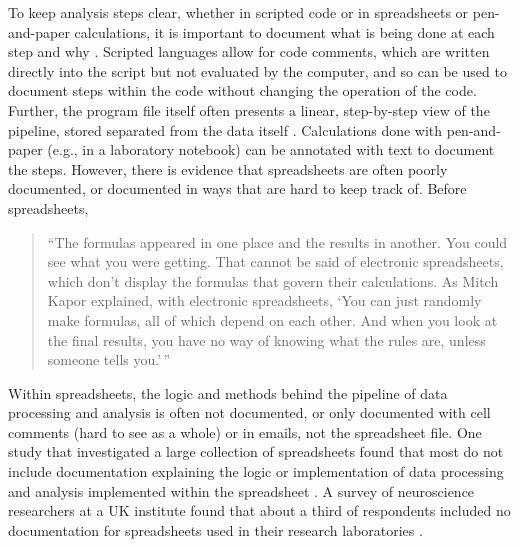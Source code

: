 \documentclass[]{tufte-book}
\begin{document}
To keep analysis steps clear, whether in scripted code or in spreadsheets or
pen-and-paper calculations, it is important to document what is being done at
each step and why \citep{goodman2014ten}. Scripted languages allow for code comments,
which are written directly into the script but not evaluated by the computer,
and so can be used to document steps within the code without changing the
operation of the code. Further, the program file itself often presents a linear,
step-by-step view of the pipeline, stored separated from the data itself
\citep{creeth1985microcomputer}. Calculations done with pen-and-paper (e.g., in a
laboratory notebook) can be annotated with text to document the steps. However,
there is evidence that spreadsheets are often poorly documented, or documented
in ways that are hard to keep track of. Before spreadsheets,

\begin{quote}
``The formulas appeared in one place and the results in another. You could see
what you were getting. That cannot be said of electronic spreadsheets, which
don't display the formulas that govern their calculations. As Mitch Kapor
explained, with electronic spreadsheets, `You can just randomly make formulas,
all of which depend on each other. And when you look at the final results, you
have no way of knowing what the rules are, unless someone tells you.'\,''
\citep{levy1984spreadsheet}
\end{quote}

Within spreadsheets, the logic and methods behind the pipeline of data
processing and analysis is often not documented, or only documented with cell
comments (hard to see as a whole) or in emails, not the spreadsheet file.
One study that investigated a large collection of spreadsheets found that most
do not include documentation explaining the logic or implementation of data
processing and analysis implemented within the spreadsheet
\citep{hermans2016spreadsheets}. A survey of neuroscience researchers at a UK
institute found that about a third of respondents included no documentation
for spreadsheets used in their research laboratories \citep{altarawneh2017pilot}.
\end{document}
